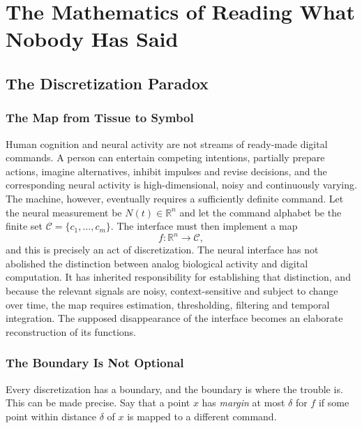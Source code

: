 \documentclass[11pt,twoside,openany]{book}
\theoremstyle{definition}
\theoremstyle{remark}
\newcommand{\R}{\mathbb{R}}
\newcommand{\C}{\mathcal{C}}
\begin{document}
\part{The Mathematics of Reading What Nobody Has Said}

\chapter{The Discretization Paradox}

\section{The Map from Tissue to Symbol}

Human cognition and neural activity are not streams of ready-made digital commands. A person can entertain competing intentions, partially prepare actions, imagine alternatives, inhibit impulses and revise decisions, and the corresponding neural activity is high-dimensional, noisy and continuously varying. The machine, however, eventually requires a sufficiently definite command. Let the neural measurement be $N(t)\in\R^{n}$ and let the command alphabet be the finite set $\C=\{c_1,\ldots,c_m\}$. The interface must then implement a map
\[
f:\R^{n}\longrightarrow\C,
\]
and this is precisely an act of discretization. The neural interface has not abolished the distinction between analog biological activity and digital computation. It has inherited responsibility for establishing that distinction, and because the relevant signals are noisy, context-sensitive and subject to change over time, the map requires estimation, thresholding, filtering and temporal integration. The supposed disappearance of the interface becomes an elaborate reconstruction of its functions.

\section{The Boundary Is Not Optional}

Every discretization has a boundary, and the boundary is where the trouble is. This can be made precise. Say that a point $x$ has \emph{margin} at most $\delta$ for $f$ if some point within distance $\delta$ of $x$ is mapped to a different command.
\end{document}
